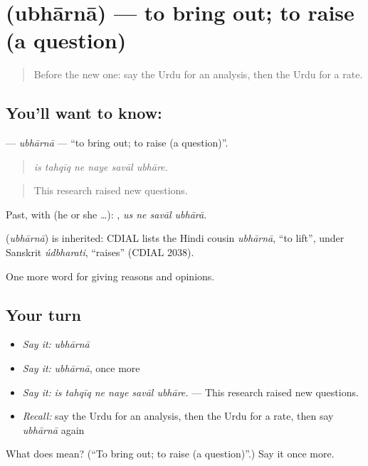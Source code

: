 \section[\texorpdfstring{\ur{ابھارنا} (ubhārnā)}{ابھارنا (ubhārnā)}]{ (ubhārnā) — to bring out; to raise (a question)}

\label{lesson:UR-C350-ubharna}



\begin{quote}
Before the new one: say the Urdu for an analysis, then the Urdu for a rate.
\end{quote}

\subsection*{You'll want to know: }
\textbf{} — \emph{ubhārnā} — \textquotedblleft{}to bring out; to raise (a question)\textquotedblright{}.

\begin{quote}
     
\end{quote}

\begin{quote}
\emph{is tahqīq ne naye savāl ubhāre.}
\end{quote}

\begin{quote}
This research raised new questions.
\end{quote}

Past, with  (he or she …):    , \emph{us ne savāl ubhārā}.

\begin{cousinweb}
\textbf{} (\emph{ubhārnā}) is inherited: CDIAL lists the Hindi cousin \emph{ubhārnā}, \textquotedblleft{}to lift\textquotedblright{}, under Sanskrit \emph{údbharati}, \textquotedblleft{}raises\textquotedblright{} (CDIAL 2038).
\end{cousinweb}

\begin{grammarlens}[title={What you've built}]
One more word for giving reasons and opinions.
\end{grammarlens}

\subsection*{Your turn}
\begin{itemize}
\raggedright
  \item \emph{Say it:} \emph{ubhārnā}
  \item \emph{Say it:} \emph{ubhārnā}, once more
  \item \emph{Say it:} \emph{is tahqīq ne naye savāl ubhāre.} — This research raised new questions.
  \item \emph{Recall:} say the Urdu for an analysis, then the Urdu for a rate, then say \emph{ubhārnā} again
\end{itemize}

\begin{tcolorbox}[breakable,colback=teal!4,colframe=teal!35!black,title={Before you move on}]
What does  mean? (\textquotedblleft{}To bring out; to raise (a question)\textquotedblright{}.) Say it once more.
\end{tcolorbox}
